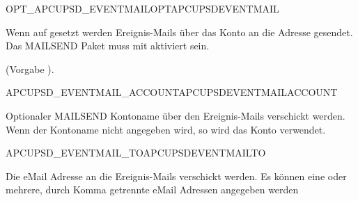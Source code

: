 \begin {description}

 {OPT\_APCUPSD\_EVENTMAIL}{OPTAPCUPSDEVENTMAIL}

  Wenn auf  gesetzt werden Ereignis-Mails über das Konto 
   an die Adresse 
   gesendet.
  Das MAILSEND Paket muss mit  aktiviert sein.
  
  (Vorgabe ). 
  
 {APCUPSD\_EVENTMAIL\_ACCOUNT}{APCUPSDEVENTMAILACCOUNT}

  Optionaler MAILSEND Kontoname über den Ereignis-Mails verschickt werden.
  Wenn der Kontoname nicht angegeben wird, so wird das Konto 
  verwendet.

 {APCUPSD\_EVENTMAIL\_TO}{APCUPSDEVENTMAILTO}

  Die eMail Adresse an die Ereignis-Mails verschickt werden.
  Es können eine oder mehrere, durch Komma getrennte eMail Adressen angegeben werden 

\end {description}

